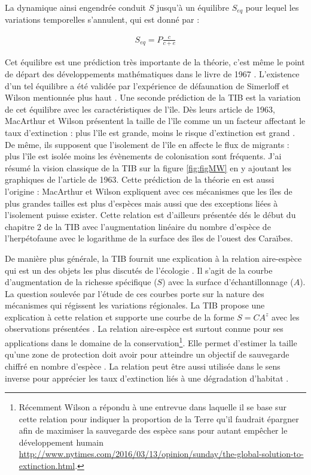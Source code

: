 La dynamique ainsi engendrée conduit \(S\) jusqu'à un équilibre
\(S_{eq}\) pour lequel les variations temporelles s'annulent, qui est
donné par :

\begin{eqnarray}
S_{eq} = P \frac{c}{c+e}
\end{eqnarray}

Cet équilibre est une prédiction très importante de la théorie, c'est
même le point de départ des développements mathématiques dans le livre
de 1967 \citep{MacArthur1967}. L'existence d'un tel équilibre a été
validée par l'expérience de défaunation de Simerloff et Wilson
mentionnée plus haut \citep{Simberloff1969}. Une seconde prédiction de
la TIB est la variation de cet équilibre avec les caractéristiques de
l'île. Dès leurs article de 1963, MacArthur et Wilson présentent la
taille de l'île comme un un facteur affectant le taux d'extinction :
plus l'île est grande, moins le risque d'extinction est grand
\citep{MacArthur1963}. De même, ils supposent que l'isolement de l'île
en affecte le flux de migrants : plus l'île est isolée moins les
évènements de colonisation sont fréquents. J'ai résumé la vision
classique de la TIB sur la figure \ref{fig:figMW} en y ajoutant les
graphiques de l'article de 1963. Cette prédiction de la théorie en est
aussi l'origine : MacArthur et Wilson expliquent avec ces mécanismes que
les îles de plus grandes tailles est plus d'espèces mais aussi que des
exceptions liées à l'isolement puisse exister. Cette relation est
d'ailleurs présentée dés le début du chapitre 2 de la TIB avec
l'augmentation linéaire du nombre d'espèce de l'herpétofaune avec le
logarithme de la surface des îles de l'ouest des Caraïbes.

De manière plus générale, la TIB fournit une explication à la relation
aire-espèce qui est un des objets les plus discutés de l'écologie
\citep{Lomolino2000a}. Il s'agit de la courbe d'augmentation de la
richesse spécifique (\(S\)) avec la surface d'échantillonnage (\(A\)).
La question soulevée par l'étude de ces courbes porte sur la nature des
mécanismes qui régissent les variations régionales. La TIB propose une
explication à cette relation et supporte une courbe de la forme
\(S=CA^z\) avec les observations présentées \citep{MacArthur1967}. La
relation aire-espèce est surtout connue pour ses applications dans le
domaine de la conservation\footnote{Récemment Wilson a répondu à une
  entrevue dans laquelle il se base sur cette relation pour indiquer la
  proportion de la Terre qu'il faudrait épargner afin de maximiser la
  sauvegarde des espèce sans pour autant empêcher le développement
  humain
  \url{http://www.nytimes.com/2016/03/13/opinion/sunday/the-global-solution-to-extinction.html}.}.
Elle permet d'estimer la taille qu'une zone de protection doit avoir
pour atteindre un objectif de sauvegarde chiffré en nombre d'espèce
\citep{Neigel2003, Desmet2004}. La relation peut être aussi utilisée
dans le sens inverse pour apprécier les taux d'extinction liés à une
dégradation d'habitat \citep{He2011}.

